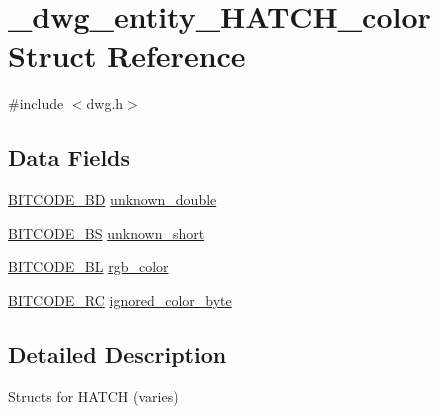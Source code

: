 \hypertarget{struct__dwg__entity__HATCH__color}{\section{\-\_\-dwg\-\_\-entity\-\_\-\-H\-A\-T\-C\-H\-\_\-color \-Struct \-Reference}
\label{struct__dwg__entity__HATCH__color}
}


{\ttfamily \#include $<$dwg.\-h$>$}

\subsection*{\-Data \-Fields}
\begin{DoxyCompactItemize}
\item 
\hyperlink{dwg_8h_a3c1e6781466b74ba07785d57da70ed97}{\-B\-I\-T\-C\-O\-D\-E\-\_\-\-B\-D} \hyperlink{struct__dwg__entity__HATCH__color_a50dbd7bf0ba09551bbcb7c21c0ace442}{unknown\-\_\-double}
\item 
\hyperlink{dwg_8h_a94297606fbd4a4ff97e8add284af0809}{\-B\-I\-T\-C\-O\-D\-E\-\_\-\-B\-S} \hyperlink{struct__dwg__entity__HATCH__color_a2562aa1927e44508af50aa77c5df728f}{unknown\-\_\-short}
\item 
\hyperlink{dwg_8h_aebd5f127038868cbabc3d55d91da776c}{\-B\-I\-T\-C\-O\-D\-E\-\_\-\-B\-L} \hyperlink{struct__dwg__entity__HATCH__color_a1da1ace689354a69692c2be7724405f1}{rgb\-\_\-color}
\item 
\hyperlink{dwg_8h_a7fd199a8f9c9cc52bdab220f65a2a619}{\-B\-I\-T\-C\-O\-D\-E\-\_\-\-R\-C} \hyperlink{struct__dwg__entity__HATCH__color_aaba511fea3a1b11ddf7c9fbf6eb9ed27}{ignored\-\_\-color\-\_\-byte}
\end{DoxyCompactItemize}


\subsection{\-Detailed \-Description}
\-Structs for \-H\-A\-T\-C\-H (varies) 

